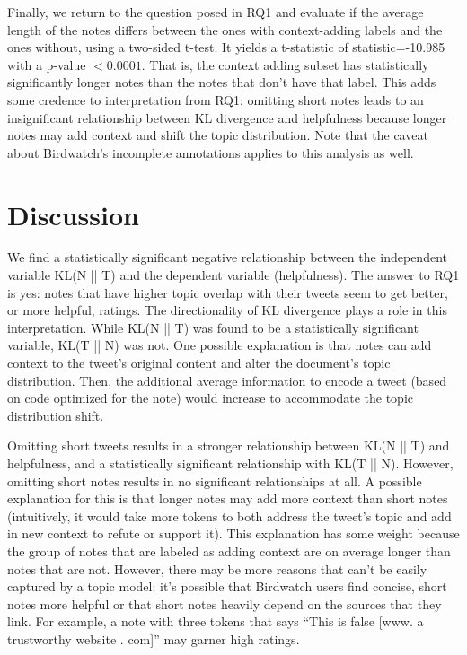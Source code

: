 \documentclass [11pt, proquest] {uwthesis}[2020/02/24]
\begin{document}

Finally,  we return to the question posed in RQ1 and evaluate if the average length of the notes differs between the ones with context-adding  labels and the ones without, using a two-sided t-test. It yields a t-statistic of statistic=-10.985 with a p-value $< 0.0001$. That is, the context adding subset has statistically significantly longer notes than the notes that don’t have that label. This adds some credence to interpretation from RQ1: omitting short notes leads to an insignificant relationship between KL divergence and helpfulness because longer notes may add context and shift the topic distribution. Note that the caveat about Birdwatch's incomplete annotations applies to this analysis as well.

\chapter{Discussion}

We find a statistically significant negative relationship between the independent variable KL(N || T) and the dependent variable (helpfulness). The answer to RQ1 is yes: notes that have higher topic overlap with their tweets seem to get better, or more helpful, ratings. The directionality of KL divergence plays a role in this interpretation. While KL(N || T) was found to be a statistically significant variable, KL(T || N) was not. One possible explanation is that notes can add context to the tweet’s original content and alter the document’s topic distribution. Then, the additional average information to encode a tweet (based on code optimized for the note) would increase to accommodate the topic distribution shift.

Omitting short tweets results in a stronger relationship between KL(N || T) and helpfulness, and a statistically significant relationship with KL(T || N). However, omitting short notes results in no significant relationships at all. A possible explanation for this is that longer notes may add more context than short notes (intuitively, it would take more tokens to both address the tweet’s topic and add in new context to refute or support it). This explanation has some weight because the group of notes that are labeled as adding context are on average longer than notes that are not. However, there may be more reasons that can’t be easily captured by a topic model: it’s possible that Birdwatch users find concise, short notes more helpful or that short notes heavily depend on the sources that they link. For example, a note with three tokens that says “This is false [www. a trustworthy website . com]” may garner high ratings.
\end{document}
